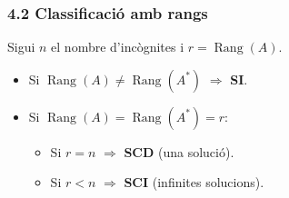 \documentclass[aspectratio=169]{beamer}
\newcommand{\textverd}[1]{{\color{margueVerdFosc}#1}}
\begin{document}
\begin{frame}[t]
  \frametitle{4.2 Classificació amb rangs}

  \vspace{-0.2cm}
  Sigui $n$ el nombre d'incògnites i $r=\operatorname{Rang}(A)$.

  \vspace{0.1cm}
  \begin{itemize}
    \item<2-> Si $\operatorname{Rang}(A)\neq\operatorname{Rang}(A^*)$ \;$\Rightarrow$\; \textverd{\textbf{SI}}.
    \item<3-> Si $\operatorname{Rang}(A)=\operatorname{Rang}(A^*)=r$:
      \begin{itemize}
        \item Si $r=n$ \;$\Rightarrow$\; \textverd{\textbf{SCD}} (una solució).
        \item Si $r<n$ \;$\Rightarrow$\; \textverd{\textbf{SCI}} (infinites solucions).
      \end{itemize}
  \end{itemize}

  \vspace{0.12cm}
\end{frame}
\end{document}
